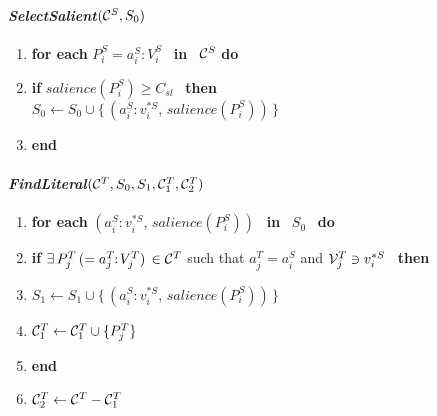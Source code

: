 \begin{figure}[p]
  \small
  \paragraph*{{\it SelectSalient\/}$({\cal C}^S,S_0)$}
  \small
  \begin{enumerate}
    \renewcommand{\theenumi}{}
    \renewcommand{\labelenumi}{}
    \addtolength{\itemsep}{-\parsep}
    \setlength{\labelsep}{-4ex}
  \item {\bf for each} $P^S_i=a^S_i\!\!:\!V^S_i$ ~{\bf in}~ ${\cal C}^S$ {\bf do}
  \item \hspace*{4ex} {\bf if} $salience(P^S_i) \geq C_{sl}$ ~{\bf then}~
    $S_0 \leftarrow S_0 \cup \{\,(a^S_i\!:\!v^{*S}_i,\, salience(P^S_i))\,\}$ 
  \item {\bf end}
  \end{enumerate}
  \setcounter{buf}{\theenumi}
  \vspace*{-\baselineskip}
  \paragraph*{{\it FindLiteral\/}$({\cal C}^T,S_0,S_1,{\cal C}^T_1,{\cal C}^T_2)$}
      \small
      \begin{enumerate}
        \setcounter{enumi}{\thebuf}
        \renewcommand{\theenumi}{}
        \renewcommand{\labelenumi}{}
        \addtolength{\itemsep}{-\parsep}
        \setlength{\labelsep}{-4ex}
      \item {\bf for each} $(a^S_i\!:\!v^{*S}_i,\,salience(P^S_i))$ ~{\bf in}~ $S_0$ ~{\bf do}
      \item \hspace*{4ex} {\bf if} $\exists\, P^T_j \,(= a^T_j\!\!:\!V^T_j)\, 
        \in {\cal C}^T$ such that $a^T_j = a^S_i$ and ${\cal V}^T_j \ni v^{*S}_i$ ~{\bf then}
      \item \hspace*{8ex} $S_1 \leftarrow S_1 \cup \{\,(a^S_i\!:\!v^{*S}_i,\,salience(P^S_i))\,\}$
      \item \hspace*{8ex} ${\cal C}^T_1 \leftarrow {\cal C}^T_1 \cup \{ P^T_j \}$
      \item {\bf end}
      \item ${\cal C}^T_2 \leftarrow {\cal C}^T - {\cal C}^T_1$
      \end{enumerate}
  \vspace*{-\baselineskip}
  \setcounter{buf}{\theenumi}

\end{figure}
